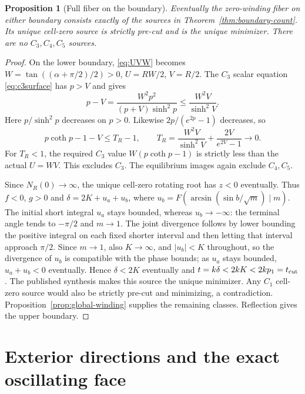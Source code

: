 \documentclass[11pt,a4paper]{article}
\newtheorem{proposition}[theorem]{Proposition}
\theoremstyle{remark}\newtheorem{remark}[theorem]{Remark}
\begin{document}
\begin{proposition}[Full fiber on the boundary]\label{prop:boundary-full}
Eventually the zero-winding fiber on either boundary consists exactly
of the sources in Theorem~\ref{thm:boundary-count}. Its unique
cell-zero source is strictly pre-cut and is the unique minimizer.
There are no $C_3,C_4,C_5$ sources.
\end{proposition}
\begin{proof}
On the lower boundary, \eqref{eq:UVW} becomes
$W=\tan((\alpha+\pi/2)/2)>0$, $U=RW/2$, $V=R/2$.
The $C_3$ scalar equation \eqref{eq:c3surface} has $p>V$ and gives
\[
 p-V=\frac{W^2p^2}{(p+V)\sinh^2p}
       \le\frac{W^2V}{\sinh^2V}.
\]
Here $p/\sinh^2p$ decreases on $p>0$.
Likewise $2p/(e^{2p}-1)$ decreases, so
\[
 p\coth p-1-V\le T_R-1,\qquad
 T_R=\frac{W^2V}{\sinh^2V}+\frac{2V}{e^{2V}-1}\longrightarrow0.
\]
For $T_R<1$, the required $C_3$ value $W(p\coth p-1)$ is
strictly less than the actual $U=WV$. This excludes $C_3$.
The equilibrium images again exclude $C_4,C_5$.

Since $N_R(0)\to\infty$, the unique cell-zero rotating root has
$z<0$ eventually. Thus $f<0$, $g>0$ and
$\delta=2K+u_a+u_b$, where
$u_b=F(\arcsin(\sin b/\sqrt m)\mid m)$.
The initial short integral $u_a$ stays bounded, whereas $u_b\to-\infty$:
the terminal angle tends to $-\pi/2$ and $m\to1$.
The joint divergence follows by lower bounding the positive integral
on each fixed shorter interval and then letting that interval approach
$\pi/2$. Since $m\to1$, also $K\to\infty$, and $|u_b|<K$ throughout,
so the divergence of $u_b$ is compatible with the phase bounds; as $u_a$
stays bounded, $u_a+u_b<0$ eventually. Hence $\delta<2K$ eventually and
$t=k\delta<2kK<2kp_1=t_{\rm cut}$.
The published synthesis makes this source the unique minimizer.
Any $C_1$ cell-zero source would also be strictly pre-cut and
minimizing, a contradiction. Proposition~\ref{prop:global-winding}
supplies the remaining classes. Reflection gives the upper boundary.
\end{proof}

\section{Exterior directions and the exact oscillating face}\label{sec:exterior}
\end{document}
